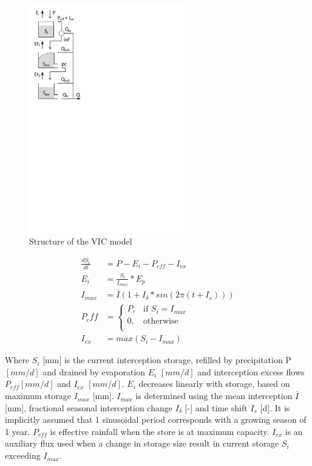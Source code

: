 { 																	%
\begin{figure}
\includegraphics[trim=1cm 17cm 7cm 1cm,width=7cm,keepaspectratio]{./AppA_files/22_schematic.pdf}
\caption{Structure of the VIC model} \label{fig:22_schematic}
\end{figure}

\begin{align}
	\frac{dS_i}{dt} &= P - E_i - P_{eff} - I_{ex} \\
	E_i &= \frac{S_i}{I_{max}}*E_p \\
	I_{max} &= \bar{I}\left(1+I_{\delta}*sin\left(2\pi(t+I_s)\right)\right)\\
	P_eff &=\begin{cases}
		P, & \text{if }S_i = I_{max} \\
		0, & \text{otherwise}\\
	\end{cases}\\
	I_{ex} &= max\left(S_i - I_{max}\right)
\end{align}

Where $S_i$ [mm] is the current interception storage, refilled by precipitation P $[mm/d]$ and drained by evaporation $E_i$ $[mm/d]$ and interception excess flows $P_{eff}$$[mm/d]$ and $I_{ex}$ $[mm/d]$. $E_i$ decreases linearly with storage, based on maximum storage $I_{max}$ [mm]. $I_{max}$ is determined using the mean interception $\bar{I}$ [mm], fractional seasonal interception change $I_{\delta}$ [-] and time shift $I_s$ [d]. It is implicitly assumed that 1 sinusoidal period corresponds with a growing season of 1 year. $P_{eff}$ is effective rainfall when the store is at maximum capacity. $I_{ex}$ is an auxiliary flux used when a change in storage size result in current storage $S_i$ exceeding $I_{max}$.

} %

